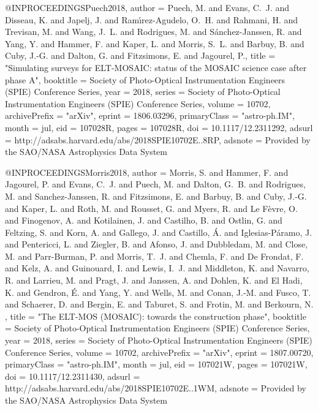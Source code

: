 \documentclass{aa}
\begin{document}
{{{{{{{{{{{{{@INPROCEEDINGS{Puech2018,
   author = {{Puech}, M. and {Evans}, C.~J. and {Disseau}, K. and {Japelj}, J. and 
	{Ram{\'{\i}}rez-Agudelo}, O.~H. and {Rahmani}, H. and {Trevisan}, M. and 
	{Wang}, J.~L. and {Rodrigues}, M. and {S{\'a}nchez-Janssen}, R. and 
	{Yang}, Y. and {Hammer}, F. and {Kaper}, L. and {Morris}, S.~L. and 
	{Barbuy}, B. and {Cuby}, J.-G. and {Dalton}, G. and {Fitzsimons}, E. and 
	{Jagourel}, P.},
    title = "{Simulating surveys for ELT-MOSAIC: status of the MOSAIC science case after phase A}",
booktitle = {Society of Photo-Optical Instrumentation Engineers (SPIE) Conference Series},
     year = 2018,
   series = {Society of Photo-Optical Instrumentation Engineers (SPIE) Conference Series},
   volume = 10702,
archivePrefix = "arXiv",
   eprint = {1806.03296},
 primaryClass = "astro-ph.IM",
    month = jul,
      eid = {107028R},
    pages = {107028R},
      doi = {10.1117/12.2311292},
   adsurl = {http://adsabs.harvard.edu/abs/2018SPIE10702E..8RP},
  adsnote = {Provided by the SAO/NASA Astrophysics Data System}
}

@INPROCEEDINGS{Morris2018,
   author = {{Morris}, S. and {Hammer}, F. and {Jagourel}, P. and {Evans}, C.~J. and 
	{Puech}, M. and {Dalton}, G.~B. and {Rodrigues}, M. and {Sanchez-Janssen}, R. and 
	{Fitzsimons}, E. and {Barbuy}, B. and {Cuby}, J.-G. and {Kaper}, L. and 
	{Roth}, M. and {Rousset}, G. and {Myers}, R. and {Le F{\`e}vre}, O. and 
	{Finogenov}, A. and {Kotilainen}, J. and {Castilho}, B. and 
	{Ostlin}, G. and {Feltzing}, S. and {Korn}, A. and {Gallego}, J. and 
	{Castillo}, {\'A}. and {Iglesias-P{\'a}ramo}, J. and {Pentericci}, L. and 
	{Ziegler}, B. and {Afonso}, J. and {Dubbledam}, M. and {Close}, M. and 
	{Parr-Burman}, P. and {Morris}, T.~J. and {Chemla}, F. and {De Frondat}, F. and 
	{Kelz}, A. and {Guinouard}, I. and {Lewis}, I.~J. and {Middleton}, K. and 
	{Navarro}, R. and {Larrieu}, M. and {Pragt}, J. and {Janssen}, A. and 
	{Dohlen}, K. and {El Hadi}, K. and {Gendron}, {\'E}. and {Yang}, Y. and 
	{Wells}, M. and {Conan}, J.-M. and {Fusco}, T. and {Schaerer}, D. and 
	{Bergin}, E. and {Taburet}, S. and {Frotin}, M. and {Berkourn}, N.
	},
    title = "{The ELT-MOS (MOSAIC): towards the construction phase}",
booktitle = {Society of Photo-Optical Instrumentation Engineers (SPIE) Conference Series},
     year = 2018,
   series = {Society of Photo-Optical Instrumentation Engineers (SPIE) Conference Series},
   volume = 10702,
archivePrefix = "arXiv",
   eprint = {1807.00720},
 primaryClass = "astro-ph.IM",
    month = jul,
      eid = {107021W},
    pages = {107021W},
      doi = {10.1117/12.2311430},
   adsurl = {http://adsabs.harvard.edu/abs/2018SPIE10702E..1WM},
  adsnote = {Provided by the SAO/NASA Astrophysics Data System}
}

}}}}}}}}}}}}}
\end{document}
